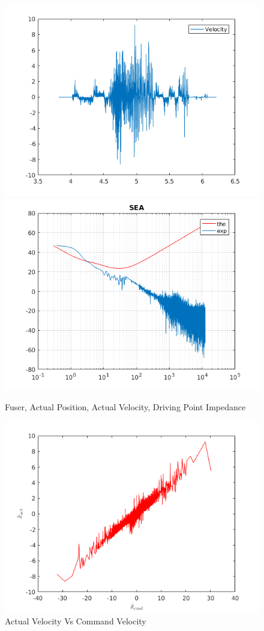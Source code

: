 \documentclass[letterpaper]{article}
\begin{document}
\begin{figure}[H]
	\includegraphics[scale=0.5]{sea_velocity.png}\includegraphics[scale=0.5]{sea_impedance.png}
	\caption{Fuser, Actual Position, Actual Velocity, Driving Point Impedance}
	\includegraphics[scale=0.8]{sea_vv.png}
	\caption{Actual Velocity Vs Command Velocity}
\end{figure}
\end{document}
